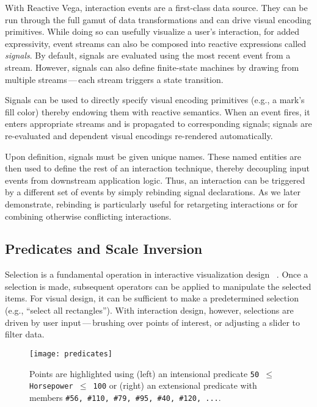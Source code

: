With Reactive Vega, interaction events are a first-class data source. They can
be run through the full gamut of data transformations and can drive visual
encoding primitives. While doing so can usefully visualize a user's interaction,
for added expressivity, event streams can also be composed into reactive
expressions called \emph{signals}. By default, signals are evaluated using the
most recent event from a stream. However, signals can also define finite-state
machines by drawing from multiple streams\,---\,each stream triggers a state
transition.

Signals can be used to directly specify visual encoding primitives (e.g., a
mark's fill color) thereby endowing them with reactive semantics. When an event
fires, it enters appropriate streams and is propagated to corresponding signals;
signals are re-evaluated and dependent visual encodings re-rendered
automatically.

Upon definition, signals must be given unique names. These named entities are
then used to define the rest of an interaction technique, thereby decoupling
input events from downstream application logic. Thus, an interaction can be
triggered by a different set of events by simply rebinding signal declarations.
As we later demonstrate, rebinding is particularly useful for retargeting
interactions or for combining otherwise conflicting interactions.

\vspace{-20pt}

\subsection{Predicates and Scale Inversion}

Selection is a fundamental operation in interactive visualization design~
\cite{heer:generalized}. Once a selection is made, subsequent operators can be
applied to manipulate the selected items. For visual design, it can be
sufficient to make a predetermined selection (e.g., ``select all rectangles'').
With interaction design, however, selections are driven by user
input\,---\,brushing over points of interest, or adjusting a slider to filter
data.

\begin{figure}[b!]
  \centering
  \texttt{[image: predicates]}
  \caption{Points are highlighted using (left) an intensional predicate
  \texttt{50 $\leq$ Horsepower $\leq$ 100} or (right) an extensional predicate
  with members \texttt{\#56, \#110, \#79, \#95, \#40, \#120, ...}.}
  \label{fig:vg:predicates}
\end{figure}

